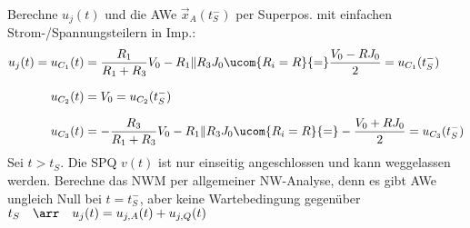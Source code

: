 \noindent Berechne $u_j(t)$ und die AWe $\vec{x}_A(t_S^-)$ per Superpos. mit einfachen Strom-/Spannungsteilern in Imp.:
\begin{align}%
	\notag u_j(t)=u_{C_1}(t)&=\frac{R_1}{R_1+R_3}V_0-R_1\|R_3J_0\ucom{R_i=R}{=}\frac{V_0-RJ_0}{2}=u_{C_1}(t_S^-)\\[2.5mm]%
%
	\label{a1h_AWe} u_{C_2}(t)&=V_0=u_{C_2}(t_S^-)\\[2.5mm]%
%
	\notag u_{C_3}(t)&=-\frac{R_3}{R_1+R_3}V_0-R_1\|R_3J_0\ucom{R_i=R}{=}-\frac{V_0+RJ_0}{2}=u_{C_3}(t_S^-)%
\end{align}%
%
Sei $t>t_S$. Die SPQ $v(t)$ ist nur einseitig angeschlossen und kann weggelassen werden. Berechne das NWM per allgemeiner NW-Analyse, denn es gibt AWe ungleich Null bei $t=t_S^-$, aber keine Wartebedingung gegenüber $t_S\quad\arr\quad u_j(t)=u_{j,A}(t)+u_{j,Q}(t)$
